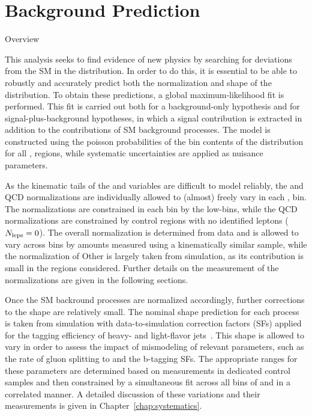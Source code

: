 \chapter{Background Prediction}
\begin{section}{Overview}

This analysis seeks to find evidence of new physics by searching for deviations from the SM in the \Nb distribution.
In order to do this, it is essential to be able to robustly and accurately predict both the normalization and shape of the \Nb distribution.
To obtain these predictions, a global maximum-likelihood fit is performed.
This fit is carried out both for a background-only hypothesis and for signal-plus-background hypotheses, in which a signal contribution is extracted in addition to the contributions of SM background processes.
The model is constructed using the poisson probabilities of the bin contents of the \Nb distribution for all \Njets, \MJ regions, while systematic uncertainties are applied as nuisance parameters.

As the kinematic tails of the \Njets and \MJ variables are difficult to model reliably, the \ttbar and QCD normalizations are individually allowed to (almost) freely vary in each \Njets, \MJ bin.
The \ttbar normalizations are constrained in each bin by the low-\Nb bins, while the QCD normalizations are constrained by control regions with no identified leptons ($N_{\mathrm{leps}} = 0$).
The overall \Wjets normalization is determined from data and is allowed to vary across \Njets bins by amounts measured using a kinematically similar \Zjets sample, while the normalization of Other is largely taken from simulation, as its contribution is small in the regions considered.
Further details on the measurement of the normalizations are given in the following sections.

Once the SM backround processes are normalized accordingly, further corrections to the \Nb shape are relatively small.
The nominal \Nb shape prediction for each process is taken from simulation with data-to-simulation correction factors (SFs) applied for the tagging efficiency of heavy- and light-flavor jets~\cite{Chatrchyan:2012jua,Sirunyan:2017ezt}.
This shape is allowed to vary in order to assess the impact of mismodeling of relevant parameters, such as the rate of gluon splitting to \bbbar and the b-tagging SFs.
The appropriate ranges for these parameters are determined based on measurements in dedicated control samples and then constrained by a simultaneous fit across all bins of \Njets and \MJ in a correlated manner.
A detailed discussion of these variations and their measurements is given in Chapter~\ref{chap:systematics}.

\end{section}

